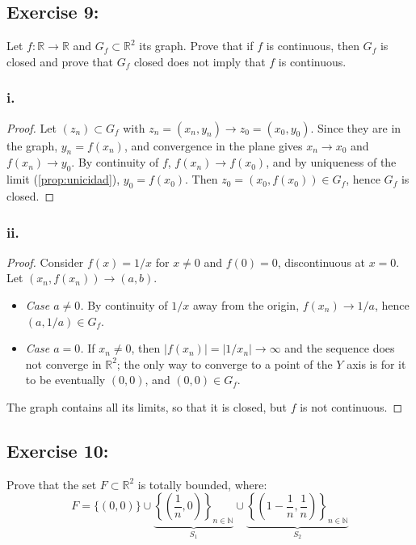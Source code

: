 \documentclass[11pt, a4paper]{article}
\begin{document}
\subsection*{Exercise 9:}

Let $f: \mathbb{R} \to \mathbb{R}$ and $G_f \subset \mathbb{R}^2$ its graph.
Prove that if $f$ is continuous, then $G_f$ is closed and prove that $G_f$ closed does not imply that
$f$ is continuous.

\subsubsection*{i.}
\begin{proof}
Let $(z_n) \subset G_f$ with $z_n = (x_n, y_n) \to z_0 = (x_0, y_0)$. Since they are in the graph,
$y_n = f(x_n)$, and convergence in the plane gives $x_n \to x_0$ and $f(x_n) \to y_0$. By continuity
of $f$, $f(x_n) \to f(x_0)$, and by uniqueness of the limit (\ref{prop:unicidad}), $y_0 = f(x_0)$. Then
$z_0 = (x_0, f(x_0)) \in G_f$, hence $G_f$ is closed.
\end{proof}

\subsubsection*{ii.}
\begin{proof}
Consider $f(x) = 1/x$ for $x \neq 0$ and $f(0) = 0$, discontinuous at $x = 0$. Let
$(x_n, f(x_n)) \to (a, b)$.
\begin{itemize}
    \item \textit{Case $a \neq 0$.} By continuity of $1/x$ away from the origin, $f(x_n) \to 1/a$,
    hence $(a, 1/a) \in G_f$.
    \item \textit{Case $a = 0$.} If $x_n \neq 0$, then $|f(x_n)| = |1/x_n| \to \infty$ and the
    sequence does not converge in $\mathbb{R}^2$; the only way to converge to a point of the $Y$ axis is for it
    to be eventually $(0, 0)$, and $(0,0) \in G_f$.
\end{itemize}
The graph contains all its limits, so that it is closed, but $f$ is not continuous.
\end{proof}

\subsection*{Exercise 10:}

Prove that the set $F \subset \mathbb{R}^2$ is totally bounded, where:
$$ F = \{(0,0)\} \cup \underbrace{\left\{ \left(\frac{1}{n}, 0\right) \right\}_{n \in
\mathbb{N}}}_{S_1} \cup \underbrace{\left\{ \left(1-\frac{1}{n}, \frac{1}{n}\right) \right\}_{n \in
\mathbb{N}}}_{S_2} $$
\end{document}
